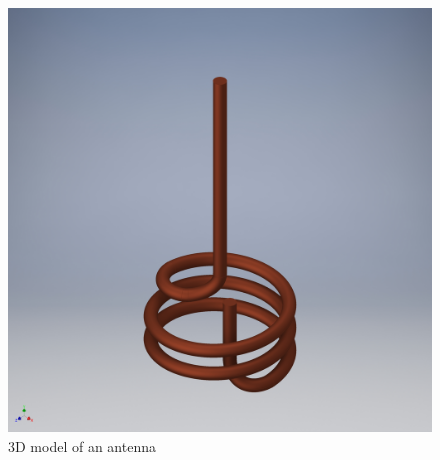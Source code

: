 \begin{figure}[h]
	\centering
	\includegraphics[width=\textwidth]{images/antenna}
	\caption{3D model of an antenna}
	\label{fig:antenna}
\end{figure}
